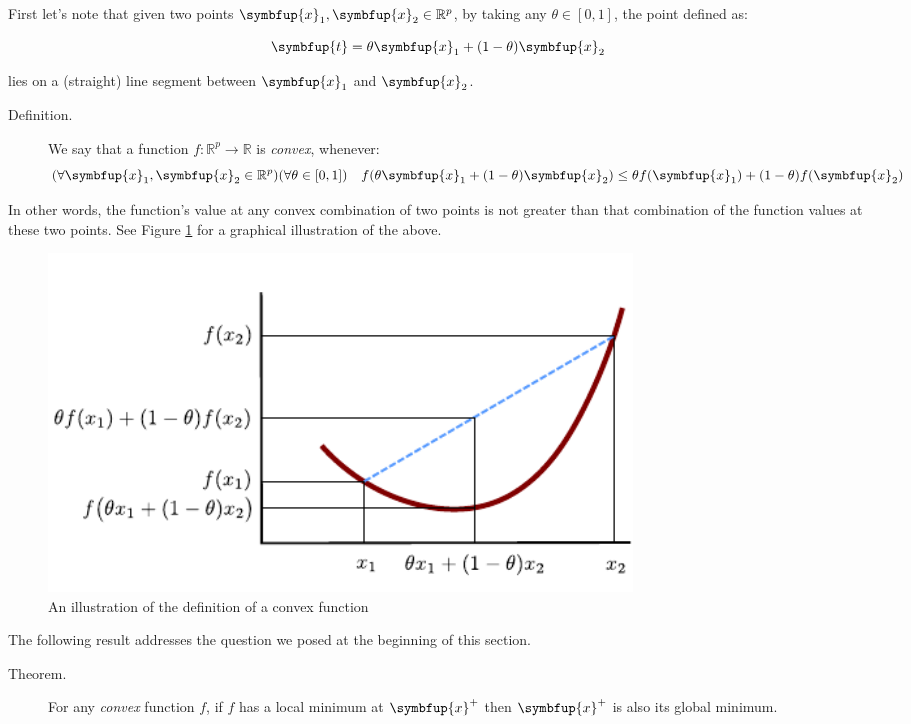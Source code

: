 \documentclass[10pt,b5paper,krantz1]{krantz}
\renewcommand{\mathbf}[1]{\symbfup{#1}}
\begin{document}
First let's note that given two points
\(\mathbf{x}_{1},\mathbf{x}_{2}\in \mathbb{R}^p\),
by taking any \(\theta\in[0,1]\), the point defined as:

\[
\mathbf{t} = \theta \mathbf{x}_{1}+(1-\theta)\mathbf{x}_{2}
\]

lies on a (straight) line segment between \(\mathbf{x}_1\) and \(\mathbf{x}_2\).

\begin{description}
\item[Definition.]
We say that a function \(f:\mathbb{R}^p\to\mathbb{R}\) is \emph{convex}, whenever:
\[
(\forall \mathbf{x}_{1},\mathbf{x}_{2}\in \mathbb{R}^p)
(\forall \theta\in [0,1])\quad
f(\theta \mathbf{x}_{1}+(1-\theta)\mathbf{x}_{2})\leq \theta f(\mathbf{x}_{1})+(1-\theta)f(\mathbf{x}_{2})
\]
\end{description}

In other words, the function's value at any convex combination of two points
is not greater than that combination of the function values at these two points.
See Figure \ref{fig:convex_function} for a graphical illustration of the above.

\begin{figure}
\hypertarget{fig:convex_function}{%
\centering
\includegraphics[width=0.75\textwidth,height=\textheight]{figures/convex_function.pdf}
\caption{An illustration of the definition of a convex function}\label{fig:convex_function}
}
\end{figure}

The following result addresses the question we posed at the beginning
of this section.

\begin{description}
\item[Theorem.]
For any \emph{convex} function \(f\), if \(f\) has a local minimum at \(\mathbf{x}^+\)
then \(\mathbf{x}^+\) is also its global minimum.
\end{description}
\end{document}
